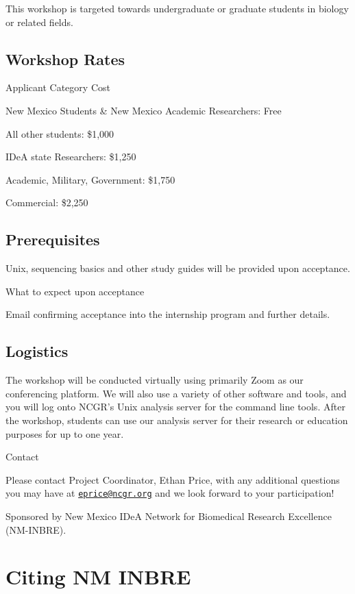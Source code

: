 \documentclass[
]{book}
\begin{document}
This workshop is targeted towards undergraduate or graduate students in biology or related fields.

\hypertarget{workshop-rates-3}{%
\section{Workshop Rates}\label{workshop-rates-3}}

Applicant Category Cost

New Mexico Students \& New Mexico Academic Researchers:
Free

All other students:
\$1,000

IDeA state Researchers:
\$1,250

Academic, Military, Government:
\$1,750

Commercial:
\$2,250

\hypertarget{prerequisites-3}{%
\section{Prerequisites}\label{prerequisites-3}}

Unix, sequencing basics and other study guides will be provided upon acceptance.

What to expect upon acceptance

Email confirming acceptance into the internship program and further details.

\hypertarget{logistics-3}{%
\section{Logistics}\label{logistics-3}}

The workshop will be conducted virtually using primarily Zoom as our conferencing platform. We will also use a variety of other software and tools, and you will log onto NCGR's Unix analysis server for the command line tools. After the workshop, students can use our analysis server for their research or education purposes for up to one year.

Contact

Please contact Project Coordinator, Ethan Price, with any additional questions you may have at \href{mailto:eprice@ncgr.org}{\nolinkurl{eprice@ncgr.org}} and we look forward to your participation!

Sponsored by New Mexico IDeA Network for Biomedical Research Excellence (NM-INBRE).

\hypertarget{citing-nm-inbre}{%
\chapter{Citing NM INBRE}\label{citing-nm-inbre}}
\end{document}

